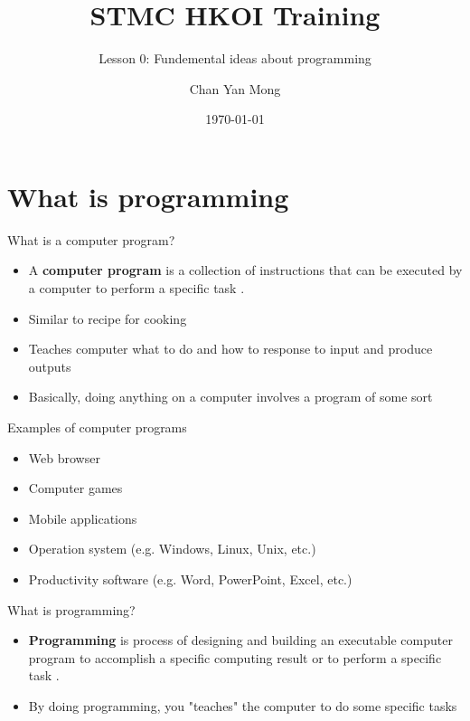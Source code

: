 \documentclass[10pt,xcolor={table,dvipsnames},t]{beamer}
\title[Your Short Title]{STMC HKOI Training}
\subtitle{Lesson 0: Fundemental ideas about programming}
\author{Chan Yan Mong}
\date{\today}
\begin{document}
\begin{frame}
  \titlepage
\end{frame}


\section{What is programming}

\begin{frame}{What is a computer program?}

\begin{itemize}
  \item A \textbf{computer program} is a collection of instructions that can be executed by a computer to perform a specific task \cite{enwiki:Computer_program}.
  \item Similar to recipe for cooking
  \item Teaches computer what to do and how to response to input and produce outputs
  \item Basically, doing anything on a computer involves a program of some sort
\end{itemize}

\end{frame}

\begin{frame}{Examples of computer programs}
  \begin{itemize}
    \item Web browser
    \item Computer games
    \item Mobile applications 
    \item Operation system (e.g. Windows, Linux, Unix, etc.)
    \item Productivity software (e.g. Word, PowerPoint, Excel, etc.)
  \end{itemize}
\end{frame}

\begin{frame}{What is programming?}
  \begin{itemize}
    \item \textbf{Programming} is process of designing and building an executable computer program to
    accomplish a specific computing result or to perform a specific task \cite{enwiki:Computer_programming}.
    \item By doing programming, you "teaches" the computer to do some specific tasks
  \end{itemize}
\end{frame}
\end{document}
